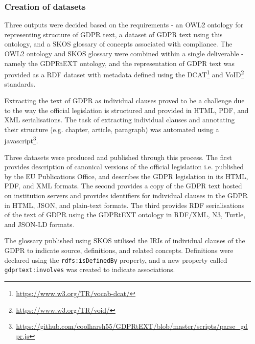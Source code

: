 \subsubsection{Creation of datasets}
Three outputs were decided based on the requirements - an OWL2 ontology for representing structure of GDPR text, a dataset of GDPR text using this ontology, and a SKOS glossary of concepts associated with compliance. The OWL2 ontology and SKOS glossary were combined within a single deliverable - namely the GDPRtEXT ontology, and the representation of GDPR text was provided as a RDF dataset with metadata defined using the DCAT\footnote{\url{https://www.w3.org/TR/vocab-dcat/}} and VoID\footnote{\url{https://www.w3.org/TR/void/}} standards.

Extracting the text of GDPR as individual clauses proved to be a challenge due to the way the official legislation is structured and provided in HTML, PDF, and XML serialisations. The task of extracting individual clauses and annotating their structure (e.g. chapter, article, paragraph) was automated using a javascript\footnote{\url{https://github.com/coolharsh55/GDPRtEXT/blob/master/scripts/parse_gdpr.js}}.

Three datasets were produced and published through this process. The first provides description of canonical versions of the official legislation i.e. published by the EU Publications Office, and describes the GDPR legislation in its HTML, PDF, and XML formats. The second provides a copy of the GDPR text hosted on institution servers and provides identifiers for individual clauses in the GDPR in HTML, JSON, and plain-text formats. The third provides RDF serialisations of the text of GDPR using the GDPRtEXT ontology in RDF/XML, N3, Turtle, and JSON-LD formats.

The glossary published using SKOS utilised the IRIs of individual clauses of the GDPR to indicate source, definitions, and related concepts. Definitions were declared using the \texttt{rdfs:isDefinedBy} property, and a new property called \texttt{gdprtext:involves} was created to indicate associations. 


